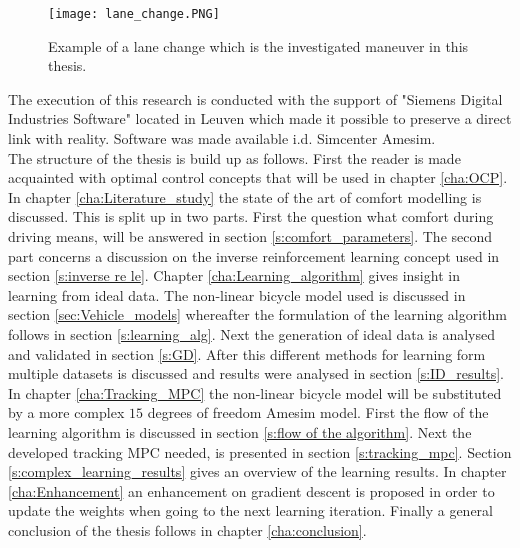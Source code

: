\begin{figure}[htp]
	\centering
	\texttt{[image: lane\_change.PNG]}
	\caption{Example of a lane change which is the investigated maneuver in this thesis.}
	\label{fig:lane_change}
\end{figure}

The execution of this research is conducted with the support of "Siemens Digital Industries Software" located in Leuven which made it possible to preserve a direct link with reality. Software was made available i.d. Simcenter Amesim.\\

The structure of the thesis is build up as follows. First the reader is made acquainted with optimal control concepts that will be used in chapter \ref{cha:OCP}. In chapter \ref{cha:Literature_study} the state of the art of comfort modelling is discussed. This is split up in two parts. First the question what comfort during driving means, will be answered in section \ref{s:comfort_parameters}. The second part concerns a discussion on the inverse reinforcement learning concept used in section \ref{s:inverse re le}. Chapter \ref{cha:Learning_algorithm} gives insight in learning from ideal data. The non-linear bicycle model used is discussed in section \ref{sec:Vehicle_models} whereafter the formulation of the learning algorithm follows in section \ref{s:learning_alg}. Next the generation of ideal data is analysed and validated in section \ref{s:GD}. After this different methods for learning form multiple datasets is discussed and results were analysed in section \ref{s:ID_results}. In chapter \ref{cha:Tracking_MPC} the non-linear bicycle model will be substituted by a more complex $15$ degrees of freedom Amesim model. First the flow of the learning algorithm is discussed in section \ref{s:flow of the algorithm}. Next the developed tracking MPC needed, is presented in section \ref{s:tracking_mpc}. Section \ref{s:complex_learning_results} gives an overview of the learning results. 
In chapter \ref{cha:Enhancement} an enhancement on gradient descent is proposed in order to update the weights when going to the next learning iteration. Finally a general conclusion of the thesis follows in chapter \ref{cha:conclusion}.\\


